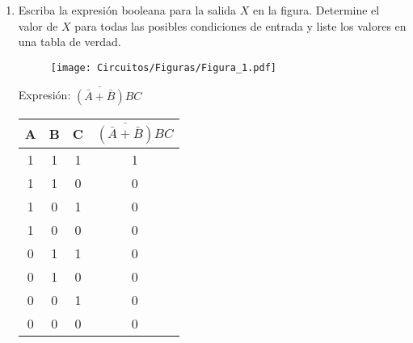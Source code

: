 \documentclass[a4paper, 12pt]{article}
\newcommand{\Aspace}{0.2cm}
\begin{document}
    \begin{enumerate}
        \item Escriba la expresión booleana para la salida $X$ en la figura. Determine el valor de $X$ para todas las posibles condiciones de entrada y liste los valores en una tabla de verdad. \par
        \begin{figure}[!ht]
            \centering
            \texttt{[image: Circuitos/Figuras/Figura\_1.pdf]}
        \end{figure}
            \vspace{\Aspace} \par
            {   \color{azul} Expresión: $\overline{(\bar{A}+\bar{B})}BC$ \par \vspace{0.5cm}
                \begin{tabular}{c|c|c|c}
                    \textbf{A}  &   \textbf{B}  &   \textbf{C}  &   $\overline{(\bar{A}+\bar{B})}BC$    \\ \hline
                    1           &   1           &   1           &   1                                   \\
                    1           &   1           &   0           &   0                                   \\
                    1           &   0           &   1           &   0                                   \\
                    1           &   0           &   0           &   0                                   \\
                    0           &   1           &   1           &   0                                   \\
                    0           &   1           &   0           &   0                                   \\
                    0           &   0           &   1           &   0                                   \\
                    0           &   0           &   0           &   0                                   \\
                \end{tabular}
            }



\end{enumerate}
\end{document}

